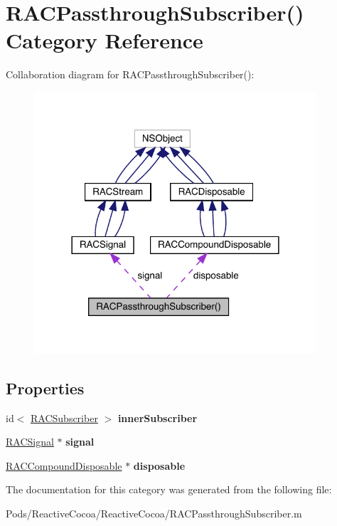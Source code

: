 \hypertarget{category_r_a_c_passthrough_subscriber_07_08}{}\section{R\+A\+C\+Passthrough\+Subscriber() Category Reference}
\label{category_r_a_c_passthrough_subscriber_07_08}


Collaboration diagram for R\+A\+C\+Passthrough\+Subscriber()\+:\nopagebreak
\begin{figure}[H]
\begin{center}
\leavevmode
\includegraphics[width=298pt]{category_r_a_c_passthrough_subscriber_07_08__coll__graph}
\end{center}
\end{figure}
\subsection*{Properties}
\begin{DoxyCompactItemize}
\item 
\mbox{\label{category_r_a_c_passthrough_subscriber_07_08_ab27d9f364f6c144170395f103635ff49}} 
id$<$ \mbox{\hyperlink{interface_r_a_c_subscriber}{R\+A\+C\+Subscriber}} $>$ {\bfseries inner\+Subscriber}
\item 
\mbox{\label{category_r_a_c_passthrough_subscriber_07_08_ad450dc59002564bf266e3ade344a112f}} 
\mbox{\hyperlink{interface_r_a_c_signal}{R\+A\+C\+Signal}} $\ast$ {\bfseries signal}
\item 
\mbox{\label{category_r_a_c_passthrough_subscriber_07_08_a153f27c4ac1cf4c9060ffd4fd35b8758}} 
\mbox{\hyperlink{interface_r_a_c_compound_disposable}{R\+A\+C\+Compound\+Disposable}} $\ast$ {\bfseries disposable}
\end{DoxyCompactItemize}


The documentation for this category was generated from the following file\+:\begin{DoxyCompactItemize}
\item 
Pods/\+Reactive\+Cocoa/\+Reactive\+Cocoa/R\+A\+C\+Passthrough\+Subscriber.\+m\end{DoxyCompactItemize}
